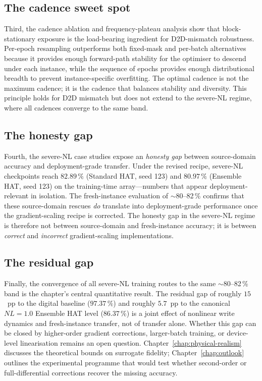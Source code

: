 \subsection{The cadence sweet spot}

Third, the cadence ablation and frequency-plateau analysis show that block-stationary exposure is the load-bearing ingredient for D2D-mismatch robustness.  Per-epoch resampling outperforms both fixed-mask and per-batch alternatives because it provides enough forward-path stability for the optimiser to descend under each instance, while the sequence of epochs provides enough distributional breadth to prevent instance-specific overfitting.  The optimal cadence is not the maximum cadence; it is the cadence that balances stability and diversity.  This principle holds for D2D mismatch but does not extend to the severe-NL regime, where all cadences converge to the same band.

\subsection{The honesty gap}

Fourth, the severe-NL case studies expose an \emph{honesty gap} between source-domain accuracy and deployment-grade transfer.  Under the revised recipe, severe-NL checkpoints reach $82.89\,\%$ (Standard HAT, seed 123) and $80.97\,\%$ (Ensemble HAT, seed 123) on the training-time array---numbers that appear deployment-relevant in isolation.  The fresh-instance evaluation of $\sim$80--82\,\% confirms that these source-domain rescues \emph{do} translate into deployment-grade performance once the gradient-scaling recipe is corrected.  The honesty gap in the severe-NL regime is therefore not between source-domain and fresh-instance accuracy; it is between \emph{correct} and \emph{incorrect} gradient-scaling implementations.

\subsection{The residual gap}

Finally, the convergence of all severe-NL training routes to the same $\sim$80--82\,\% band is the chapter's central quantitative result.  The residual gap of roughly $15$~pp to the digital baseline ($97.37\,\%$) and roughly $5.7$~pp to the canonical $NL=1.0$ Ensemble HAT level ($86.37\,\%$) is a joint effect of nonlinear write dynamics and fresh-instance transfer, not of transfer alone.  Whether this gap can be closed by higher-order gradient corrections, larger-batch training, or device-level linearisation remains an open question.  Chapter~\ref{chap:physical-realism} discusses the theoretical bounds on surrogate fidelity; Chapter~\ref{chap:outlook} outlines the experimental programme that would test whether second-order or full-differential corrections recover the missing accuracy.


